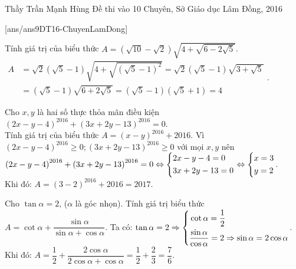 \begin{name}
{Thầy  Trần Mạnh Hùng}
{Đề thi vào 10 Chuyên, Sở Giáo dục Lâm Đồng, 2016}
\end{name}
\setcounter{ex}{0}
[ans/ans9DT16-ChuyenLamDong]
\begin{ex}%
    Tính giá trị của biểu thức $A=\left(\sqrt{10}-\sqrt{2}\right)\sqrt{4+\sqrt{6-2\sqrt{5}}}$.
\loigiai
    {\newline\indent
    $
    \begin{aligned}
    A&=\sqrt{2}\left(\sqrt{5}-1\right)\sqrt{4+\sqrt{\left(\sqrt{5}-1\right)^2}}=\sqrt{2}\left(\sqrt{5}-1\right)\sqrt{3+\sqrt{5}}\\&
    =\left(\sqrt{5}-1\right)\sqrt{6+2\sqrt{5}}=\left(\sqrt{5}-1\right)\left(\sqrt{5}+1\right)=4
    \end{aligned}
    $.
    }
\end{ex}

\begin{ex}%
    Cho $x,y$ là hai số thực thỏa mãn điều kiện $\left(2x-y-4\right)^{2016}+\left(3x+2y-13\right)^{2016}=0$.\\
    \indent Tính giá trị của biểu thức $A=\left(x-y\right)^{2016}+2016$.
\loigiai
    { Vì $\left(2x-y-4\right)^{2016}\ge 0; \left(3x+2y-13\right)^{2016}\ge 0$ với mọi $x,y$ nên\\
    $\left(2x-y-4\right)^{2016}+\left(3x+2y-13\right)^{2016}=0\Leftrightarrow \left\{\begin{aligned}&2x-y-4=0\\&3x+2y-13=0\end{aligned}\right.\Leftrightarrow \left\{\begin{aligned}&x=3\\&y=2\end{aligned}\right.$.\\
    Khi đó: $A=(3-2)^{2016}+2016=2017$.
    }
\end{ex}

\begin{ex}%
    Cho $\tan \alpha =2$, ($\alpha$ là góc nhọn). Tính giá trị biểu thức $A=\cot \alpha+\dfrac{\sin \alpha}{\sin \alpha+\cos \alpha}$.
\loigiai
    {Ta có: $\tan \alpha =2\Rightarrow\left\{\begin{aligned}&\cot \alpha =\dfrac{1}{2}\\&\dfrac{\sin \alpha}{\cos\alpha}=2\Rightarrow \sin\alpha=2\cos\alpha\end{aligned}\right.$.\\
    Khi đó: $A=\dfrac{1}{2}+\dfrac{2\cos\alpha}{2\cos\alpha+\cos\alpha}=\dfrac{1}{2}+\dfrac{2}{3}=\dfrac{7}{6}$.
    }
\end{ex}


